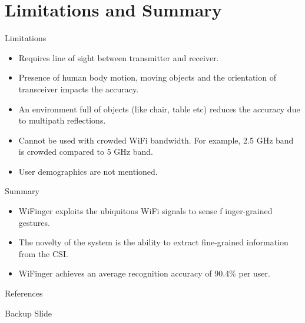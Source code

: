 \documentclass{beamer}
\begin{document}
\section{Limitations and Summary}
\begin{frame}{Limitations}
	\begin{itemize}
		\item Requires line of sight between transmitter and receiver.
		\item Presence of human body motion, moving objects and the orientation of transceiver impacts the accuracy.
		\item An environment full of objects (like chair, table etc) reduces the accuracy due to multipath reflections.
		\item Cannot be used with crowded WiFi bandwidth. For example, 2.5 GHz band is crowded compared to 5 GHz band.
		\item User demographics are not mentioned.
	\end{itemize}
\end{frame}


\begin{frame}{Summary}
	\begin{itemize}
		\item WiFinger exploits the ubiquitous WiFi signals to sense f
		inger-grained gestures.
		\item The novelty of the system is the ability to extract fine-grained information from the CSI.
		\item WiFinger achieves an average recognition accuracy of 90.4\% per user.
	\end{itemize}

\end{frame}


\appendix

\begin{frame}{References}
	
	
\end{frame}


\begin{frame}{Backup Slide}
	
\end{frame}

\end{document}
